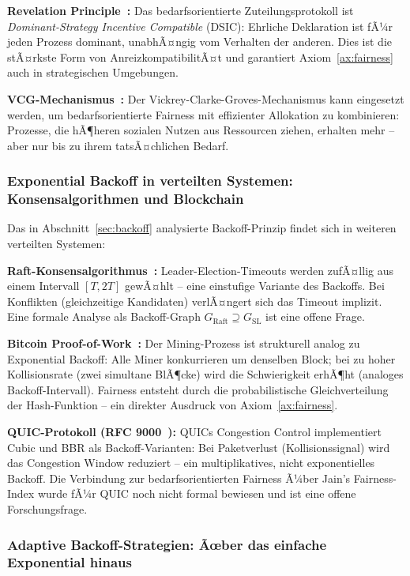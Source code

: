 ﻿\documentclass[a4paper,12pt]{article}
\theoremstyle{definition}
\begin{document}
\textbf{Revelation Principle~\cite{myerson1981optimal}:}
Das bedarfsorientierte Zuteilungsprotokoll ist
\emph{Dominant-Strategy Incentive Compatible} (DSIC):
Ehrliche Deklaration ist fÃ¼r jeden Prozess dominant,
unabhÃ¤ngig vom Verhalten der anderen. Dies ist die stÃ¤rkste
Form von AnreizkompatibilitÃ¤t und garantiert Axiom~\ref{ax:fairness}
auch in strategischen Umgebungen.

\textbf{VCG-Mechanismus~\cite{vickrey1961counterspeculation}:}
Der Vickrey-Clarke-Groves-Mechanismus kann eingesetzt werden,
um bedarfsorientierte Fairness mit effizienter Allokation
zu kombinieren: Prozesse, die hÃ¶heren sozialen Nutzen aus
Ressourcen ziehen, erhalten mehr -- aber nur bis zu ihrem
tatsÃ¤chlichen Bedarf.

\subsubsection{Exponential Backoff in verteilten Systemen:
Konsensalgorithmen und Blockchain}

Das in Abschnitt~\ref{sec:backoff} analysierte Backoff-Prinzip
findet sich in weiteren verteilten Systemen:

\textbf{Raft-Konsensalgorithmus~\cite{ongaro2014raft}:}
Leader-Election-Timeouts werden zufÃ¤llig aus einem Intervall
$[T, 2T]$ gewÃ¤hlt -- eine einstufige Variante des Backoffs.
Bei Konflikten (gleichzeitige Kandidaten) verlÃ¤ngert sich
das Timeout implizit. Eine formale Analyse als
Backoff-Graph $G_{\mathrm{Raft}} \supseteq G_{\mathrm{SL}}$
ist eine offene Frage.

\textbf{Bitcoin Proof-of-Work~\cite{nakamoto2008bitcoin}:}
Der Mining-Prozess ist strukturell analog zu Exponential
Backoff: Alle Miner konkurrieren um denselben Block; bei
zu hoher Kollisionsrate (zwei simultane BlÃ¶cke) wird die
Schwierigkeit erhÃ¶ht (analoges Backoff-Intervall). Fairness
entsteht durch die probabilistische Gleichverteilung der
Hash-Funktion -- ein direkter Ausdruck von
Axiom~\ref{ax:fairness}.

\textbf{QUIC-Protokoll (RFC 9000~\cite{rfc9000}):} QUICs
Congestion Control implementiert Cubic und BBR als
Backoff-Varianten: Bei Paketverlust (Kollisionssignal)
wird das Congestion Window reduziert -- ein multiplikatives,
nicht exponentielles Backoff. Die Verbindung zur
bedarfsorientierten Fairness Ã¼ber Jain's Fairness-Index
wurde fÃ¼r QUIC noch nicht formal bewiesen und ist
eine offene Forschungsfrage.

\subsubsection{Adaptive Backoff-Strategien: Ãœber das einfache
Exponential hinaus}
\end{document}
